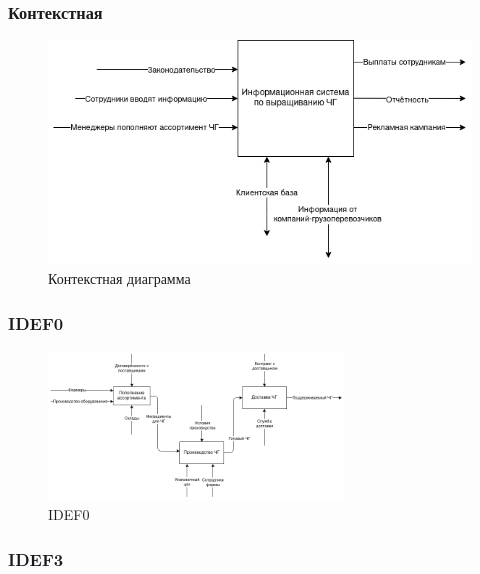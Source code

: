 \documentclass[a4paper,8pt]{article}
\begin{document}
\subsubsection{Контекстная}

    \begin{figure}[h]
        \includegraphics[width=1\textwidth]{./pics/context.png}
        \caption {Контекстная диаграмма}
        \centering
    \end{figure}

\subsubsection{IDEF0}


    \begin{figure}[h]
        \includegraphics[width=0.7\textwidth]{./pics/IDEF0.png}
        \caption {IDEF0}
        \centering
    \end{figure}


\subsubsection{IDEF3}
\end{document}
